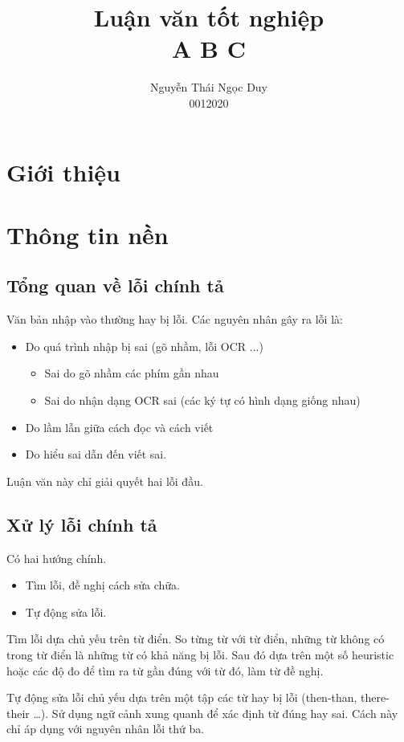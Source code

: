 \documentclass[a4paper]{book}
\title{Luận văn tốt nghiệp\\A B C}
\author{Nguyễn Thái Ngọc Duy\\0012020}
\begin{document}
\maketitle

\chapter{Giới thiệu}
\label{cha:intro}


\chapter{Thông tin nền}
\label{cha:background}

\section{Tổng quan về lỗi chính tả}

Văn bản nhập vào thường hay bị lỗi. Các nguyên nhân gây ra lỗi là:
\begin{itemize}
\item Do quá trình nhập bị sai (gõ nhầm, lỗi OCR ...)
  \begin{itemize}
  \item Sai do gõ nhầm các phím gần nhau
  \item Sai do nhận dạng OCR sai (các ký tự có hình dạng giống nhau)
  \end{itemize}
\item Do lầm lẫn giữa cách đọc và cách viết
\item Do hiểu sai dẫn đến viết sai.
\end{itemize}

Luận văn này chỉ giải quyết hai lỗi đầu.

\section{Xử lý lỗi chính tả}

Có hai hướng chính.
\begin{itemize}
\item Tìm lỗi, đề nghị cách sửa chữa.
\item Tự động sửa lỗi.
\end{itemize}

Tìm lỗi dựa chủ yếu trên từ điển. So từng từ với từ điển, những từ
không có trong từ điển là những từ có khả năng bị lỗi. Sau đó dựa trên
một số heuristic hoặc các độ đo để tìm ra từ gần đúng với từ đó, làm
từ đề nghị.

Tự động sửa lỗi chủ yếu dựa trên một tập các từ hay bị lỗi (then-than,
there-their \ldots). Sử dụng ngữ cảnh xung quanh để xác định từ đúng
hay sai. Cách này chỉ áp dụng với nguyên nhân lỗi thứ ba. 
\end{document}
